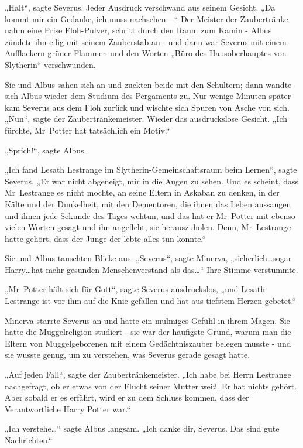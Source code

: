{„Halt“, sagte Severus. Jeder Ausdruck verschwand aus seinem Gesicht. „Da kommt mir ein Gedanke, ich muss nachsehen—“ Der Meister der Zaubertränke nahm eine Prise Floh-Pulver, schritt durch den Raum zum Kamin - Albus zündete ihn eilig mit seinem Zauberstab an - und dann war Severus mit einem Aufflackern grüner Flammen und den Worten „Büro des Hausoberhauptes von Slytherin“ verschwunden.

Sie und Albus sahen sich an und zuckten beide mit den Schultern; dann wandte sich Albus wieder dem Studium des Pergaments zu. Nur wenige Minuten später kam Severus aus dem Floh zurück und wischte sich Spuren von Asche von sich. „Nun“, sagte der Zaubertränkemeister. Wieder das ausdruckslose Gesicht. „Ich fürchte, Mr~Potter hat tatsächlich ein Motiv.“

„Sprich!“, sagte Albus.

„Ich fand Lesath Lestrange im Slytherin-Gemeinschaftsraum beim Lernen“, sagte Severus. „Er war nicht abgeneigt, mir in die Augen zu sehen. Und es scheint, dass Mr~Lestrange es nicht mochte, an seine Eltern in Askaban zu denken, in der Kälte und der Dunkelheit, mit den Dementoren, die ihnen das Leben aussaugen und ihnen jede Sekunde des Tages wehtun, und das hat er Mr~Potter mit ebenso vielen Worten gesagt und ihn angefleht, sie herauszuholen. Denn, Mr~Lestrange hatte gehört, dass der Junge-der-lebte alles tun konnte.“

Sie und Albus tauschten Blicke aus. „Severus“, sagte Minerva, „sicherlich…sogar Harry…hat mehr gesunden Menschenverstand als das…“ Ihre Stimme verstummte.

„Mr~Potter hält sich für Gott“, sagte Severus ausdruckslos, „und Lesath Lestrange ist vor ihm auf die Knie gefallen und hat aus tiefstem Herzen gebetet.“

Minerva starrte Severus an und hatte ein mulmiges Gefühl in ihrem Magen. Sie hatte die Muggelreligion studiert - sie war der häufigste Grund, warum man die Eltern von Muggelgeborenen mit einem Gedächtniszauber belegen musste - und sie wusste genug, um zu verstehen, was Severus gerade gesagt hatte.

„Auf jeden Fall“, sagte der Zaubertränkemeister. „Ich habe bei Herrn Lestrange nachgefragt, ob er etwas von der Flucht seiner Mutter weiß. Er hat nichts gehört. Aber sobald er es erfährt, wird er zu dem Schluss kommen, dass der Verantwortliche Harry Potter war.“

„Ich verstehe…“ sagte Albus langsam. „Ich danke dir, Severus. Das sind gute Nachrichten.“

}
